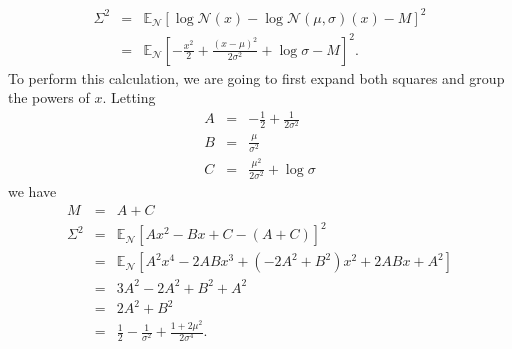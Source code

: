 \documentclass[12pt]{article}
\newcommand{\E}{\mathbb{E}}
\newcommand{\N}{\mathcal{N}}
\begin{document}
\begin{eqnarray*}
 \Sigma^2 & = & \E_\N\left[ \log \N(x) - \log \N(\mu,\sigma)(x) - M \right]^2 \\
 & = & \E_\N \left[ -\frac{x^2}{2} + \frac{(x-\mu)^2}{2\sigma^2} + \log \sigma - M \right]^2.
\end{eqnarray*}
To perform this calculation, we are going to first expand both squares
and group the powers of $x$.  Letting
\begin{eqnarray*}
 A & = & -\frac{1}{2} + \frac{1}{2 \sigma^2} \\
 B & = & \frac{\mu}{\sigma^2} \\
 C & = & \frac{\mu^2}{2\sigma^2} + \log \sigma
\end{eqnarray*}
we have
\begin{eqnarray*}
 M & = & A + C \\
 \Sigma^2 & = & \E_\N \left[ A x^2 - B x + C - (A + C)\right]^2 \\
 & = & \E_\N \left[ A^2 x^4 - 2 A B x^3 + \left(-2A^2 + B^2\right) x^2 + 2 A B x + A^2 \right] \\
 & = & 3A^2 -2A^2 + B^2 + A^2 \\
 & = & 2A^2 + B^2 \\
 & = & \frac{1}{2} - \frac{1}{\sigma^2} + \frac{1 + 2\mu^2}{2\sigma^4}.
\end{eqnarray*}
\end{document}
